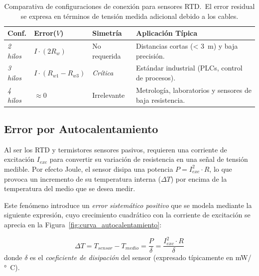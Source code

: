 \begin{table}[!htbp] 
    \centering
    \caption[Comparativa de configuraciones de conexión para sensores RTD.]{Comparativa de configuraciones de conexión para sensores RTD.\ El error residual se expresa en términos de tensión medida adicional debido a los cables.\protect\label{tab:resumen_hilos}}
    \setlength{\tabcolsep}{3pt} %
    \begin{tabularx}{\linewidth}{M{2cm} M{2cm} M{2cm} X}
        \toprule 
        \textbf{Conf.} & \textbf{Error($V$)} & \textbf{Simetría} & \textbf{Aplicación Típica} \\
        \midrule
        \emph{2 hilos} & $I \cdot (2R_w)$ & No requerida & Distancias cortas (< \qty{3}{m}) y baja precisión. \\ 
        \emph{3 hilos} & $I \cdot (R_{w1} - R_{w3})$ &
        \emph{Crítica} & Estándar industrial (PLCs, control de procesos). \\ 
        \emph{4 hilos} & $\approx 0$ & Irrelevante & Metrología, laboratorios y sensores de baja resistencia. \\ 
        \bottomrule 
    \end{tabularx} 
\end{table}


\subsection{Error por Autocalentamiento}\label{subsec:autocalentamiento}

Al ser los RTD y termistores sensores pasivos, requieren una corriente de excitación $I_{exc}$ para convertir su variación de resistencia en una señal de tensión medible. Por efecto Joule, el sensor disipa una potencia $P = I_{exc}^2 \cdot R$, lo que provoca un incremento de su temperatura interna ($\Delta T$) por encima de la temperatura del medio que se desea medir.

Este fenómeno introduce un \emph{error sistemático positivo} que se modela mediante la siguiente expresión, cuyo crecimiento cuadrático con la corriente de excitación se aprecia en la Figura~\ref{fig:curva_autocalentamiento}:

\begin{equation}\label{eq:autocalentamiento}
    \Delta T = T_{sensor} - T_{medio} = \frac{P}{\delta} = \frac{I_{exc}^2 \cdot R}{\delta}
\end{equation}
donde $\delta$ es el \emph{coeficiente de disipación} del sensor (expresado típicamente en \unit{mW/\degree C}).

